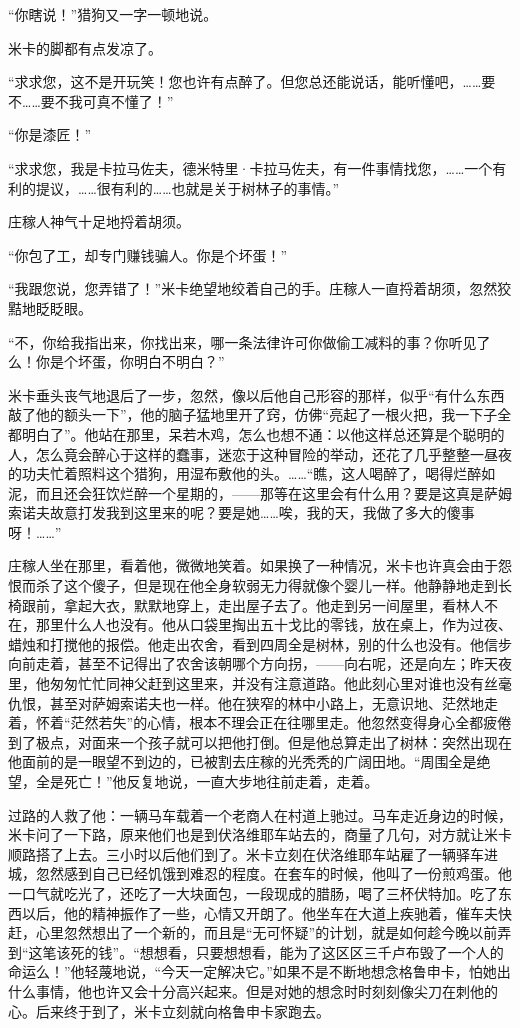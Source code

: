 \par “你瞎说！”猎狗又一字一顿地说。
\par 米卡的脚都有点发凉了。
\par “求求您，这不是开玩笑！您也许有点醉了。但您总还能说话，能听懂吧，……要不……要不我可真不懂了！”
\par “你是漆匠！”
\par “求求您，我是卡拉马佐夫，德米特里·卡拉马佐夫，有一件事情找您，……一个有利的提议，……很有利的……也就是关于树林子的事情。”
\par 庄稼人神气十足地捋着胡须。
\par “你包了工，却专门赚钱骗人。你是个坏蛋！”
\par “我跟您说，您弄错了！”米卡绝望地绞着自己的手。庄稼人一直捋着胡须，忽然狡黠地眨眨眼。
\par “不，你给我指出来，你找出来，哪一条法律许可你做偷工减料的事？你听见了么！你是个坏蛋，你明白不明白？”
\par 米卡垂头丧气地退后了一步，忽然，像以后他自己形容的那样，似乎“有什么东西敲了他的额头一下”，他的脑子猛地里开了窍，仿佛“亮起了一根火把，我一下子全都明白了”。他站在那里，呆若木鸡，怎么也想不通：以他这样总还算是个聪明的人，怎么竟会醉心于这样的蠢事，迷恋于这种冒险的举动，还花了几乎整整一昼夜的功夫忙着照料这个猎狗，用湿布敷他的头。……“瞧，这人喝醉了，喝得烂醉如泥，而且还会狂饮烂醉一个星期的，——那等在这里会有什么用？要是这真是萨姆索诺夫故意打发我到这里来的呢？要是她……唉，我的天，我做了多大的傻事呀！……”
\par 庄稼人坐在那里，看着他，微微地笑着。如果换了一种情况，米卡也许真会由于怨恨而杀了这个傻子，但是现在他全身软弱无力得就像个婴儿一样。他静静地走到长椅跟前，拿起大衣，默默地穿上，走出屋子去了。他走到另一间屋里，看林人不在，那里什么人也没有。他从口袋里掏出五十戈比的零钱，放在桌上，作为过夜、蜡烛和打搅他的报偿。他走出农舍，看到四周全是树林，别的什么也没有。他信步向前走着，甚至不记得出了农舍该朝哪个方向拐，——向右呢，还是向左；昨天夜里，他匆匆忙忙同神父赶到这里来，并没有注意道路。他此刻心里对谁也没有丝毫仇恨，甚至对萨姆索诺夫也一样。他在狭窄的林中小路上，无意识地、茫然地走着，怀着“茫然若失”的心情，根本不理会正在往哪里走。他忽然变得身心全都疲倦到了极点，对面来一个孩子就可以把他打倒。但是他总算走出了树林：突然出现在他面前的是一眼望不到边的，已被割去庄稼的光秃秃的广阔田地。“周围全是绝望，全是死亡！”他反复地说，一直大步地往前走着，走着。
\par 过路的人救了他：一辆马车载着一个老商人在村道上驰过。马车走近身边的时候，米卡问了一下路，原来他们也是到伏洛维耶车站去的，商量了几句，对方就让米卡顺路搭了上去。三小时以后他们到了。米卡立刻在伏洛维耶车站雇了一辆驿车进城，忽然感到自己已经饥饿到难忍的程度。在套车的时候，他叫了一份煎鸡蛋。他一口气就吃光了，还吃了一大块面包，一段现成的腊肠，喝了三杯伏特加。吃了东西以后，他的精神振作了一些，心情又开朗了。他坐车在大道上疾驰着，催车夫快赶，心里忽然想出了一个新的，而且是“无可怀疑”的计划，就是如何趁今晚以前弄到“这笔该死的钱”。“想想看，只要想想看，能为了这区区三千卢布毁了一个人的命运么！”他轻蔑地说，“今天一定解决它。”如果不是不断地想念格鲁申卡，怕她出什么事情，他也许又会十分高兴起来。但是对她的想念时时刻刻像尖刀在刺他的心。后来终于到了，米卡立刻就向格鲁申卡家跑去。
